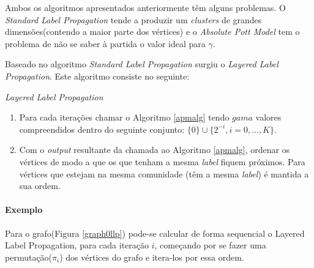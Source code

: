   Ambos os algoritmos apresentados anteriormente têm alguns problemas. O \textit{Standard Label Propagation} tende a produzir um \textit{clusters} de grandes dimensões(contendo a maior parte dos vértices) e o \textit{Absolute Pott Model} tem o problema de não se saber à partida o valor ideal para $\gamma$.
  
  Baseado no algoritmo \textit{Standard Label Propagation} surgiu o \textit{Layered Label Propagation}. Este algoritmo consiste no seguinte:
  
  \begin{algorithm}
    \caption{\textit{Layered Label Propagation}}\label{llpalg}
    \begin{enumerate}
    \item Para cada iterações chamar o Algoritmo \ref{apmalg} tendo $gama$ valores compreendidos dentro do seguinte conjunto: $\{0\}\cup\{2^{{-}i},i=0,...,K\} $.
    \item Com o \textit{output} resultante da chamada ao Algoritmo \ref{apmalg}, ordenar os vértices de modo a que os que tenham a mesma \textit{label} fiquem próximos. Para vértices que estejam na mesma comunidade (têm a mesma \textit{label}) é mantida a sua ordem.
    \end{enumerate} 
  \end{algorithm}
  
  \paragraph{Exemplo} Para o grafo(Figura \ref{graph0llp}) pode-se calcular de forma sequencial o Layered Label Propagation, para cada iteração $i$, começando por se fazer uma permutação($\pi_i$) dos vértices do grafo e itera-los por essa ordem. 
  
